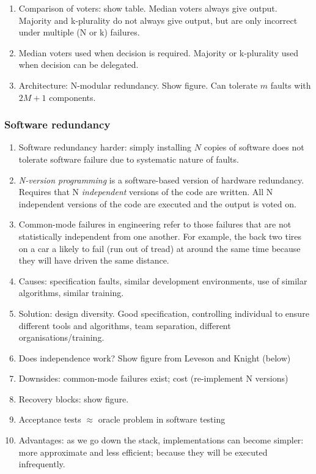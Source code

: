\documentclass[11pt]{article}
\begin{document}
\begin{enumerate}
 \item Comparison of voters: show table. Median voters always give output. Majority and k-plurality do not always give output, but are only incorrect under multiple (N or k) failures.

 \item Median voters used when decision is required. Majority or k-plurality used when decision can be delegated.

 \item Architecture: N-modular redundancy. Show figure. Can tolerate $m$ faults with $2M + 1$ components.

\end{enumerate}

\subsubsection*{Software redundancy}

\begin{enumerate}

 \item Software redundancy harder: simply installing $N$ copies of software does not tolerate software failure due to systematic nature of faults.

 \item \emph{N-version programming} is a software-based version of hardware redundancy. Requires that N \emph{independent} versions of the code are written.  All N independent versions of the code are executed and the output is voted on.

 \item Common-mode failures in engineering refer to those failures that are not statistically independent from one another. For example, the back two tires on a car a likely to fail (run out of tread) at around the same time because they will have driven the same distance.

 \item Causes: specification faults, similar development environments, use of similar algorithms, similar training.

 \item Solution: design diversity. Good specification, controlling individual to ensure different tools and algorithms, team separation, different organisations/training.

 \item Does independence work? Show figure from Leveson and Knight (below)

 \item Downsides: common-mode failures exist; cost (re-implement N versions)

 \item Recovery blocks: show figure.

 \item Acceptance tests $\approx$ oracle problem in software testing

 \item Advantages: as we go down the stack, implementations can become simpler: more approximate and less efficient; because they will be executed infrequently.

\end{enumerate}
\end{document}
